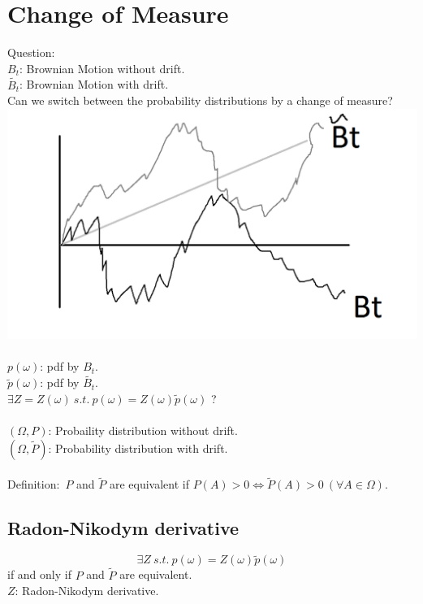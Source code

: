 \documentclass[12pt]{article}
\begin{document}
\section{Change of Measure}
Question:\\
$B_t$: Brownian Motion without drift.\\
$\tilde{B_t}$: Brownian Motion with drift.\\
Can we switch between the probability distributions by a change of measure?\\
\includegraphics[scale=0.45]{Figure_2_ChangeofMeasure.png}\\
\\
$p(\omega)$: pdf by $B_t$.\\
$\tilde{p}(\omega)$: pdf by $\tilde{B_t}$.\\
$\exists Z=Z(\omega)\ s.t.\ p(\omega)=Z(\omega)\tilde{p}(\omega)$ ?\\
\\
$(\Omega, P)$: Probaility distribution without drift.\\
$(\Omega, \tilde{P})$: Probability distribution with drift.\\
\\
Definition:\
$P$ and $\tilde{P}$ are equivalent if $P(A)>0\Leftrightarrow\tilde{P}(A)>0 \ (\forall A\in\Omega)$.

\subsection{Radon-Nikodym derivative}
$$\exists Z\ s.t.\ p(\omega)=Z(\omega)\tilde{p}(\omega)$$
if and only if $P$ and $\tilde{P}$ are equivalent.\\
$Z$: Radon-Nikodym derivative.
\end{document}
